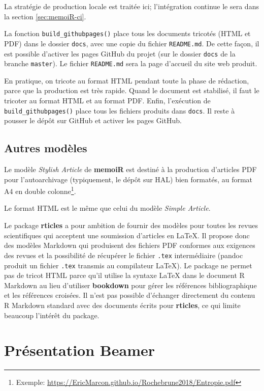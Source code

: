 \documentclass[
  12pt,
  french,
  a4paper,
  extrafontsizes,onecolumn,openright
  ]{memoir}
\begin{document}
La stratégie de production locale est traitée ici; l'intégration continue le sera dans la section \ref{sec:memoiR-ci}.

La fonction \texttt{build\_githubpages()} place tous les documents tricotés (HTML et PDF) dans le dossier \texttt{docs}, avec une copie du fichier \texttt{README.md}.
De cette façon, il est possible d'activer les pages GitHub du projet (sur le dossier \texttt{docs} de la branche \texttt{master}).
Le fichier \texttt{README.md} sera la page d'accueil du site web produit.

En pratique, on tricote au format HTML pendant toute la phase de rédaction, parce que la production est très rapide.
Quand le document est stabilisé, il faut le tricoter au format HTML et au format PDF.
Enfin, l'exécution de \texttt{build\_githubpages()} place tous les fichiers produits dans \texttt{docs}.
Il reste à pousser le dépôt sur GitHub et activer les pages GitHub.

\hypertarget{autres-moduxe8les}{%
\subsection{Autres modèles}\label{autres-moduxe8les}}

Le modèle \emph{Stylish Article} de \textbf{memoiR} est destiné à la production d'articles PDF pour l'autoarchivage (typiquement, le dépôt sur HAL) bien formatés, au format A4 en double colonne\footnote{Exemple: \url{https://EricMarcon.github.io/Rochebrune2018/Entropie.pdf}}.

Le format HTML est le même que celui du modèle \emph{Simple Article}.

Le package \textbf{rticles} a pour ambition de fournir des modèles pour toutes les revues scientifiques qui acceptent une soumission d'articles en LaTeX.
Il propose donc des modèles Markdown qui produisent des fichiers PDF conformes aux exigences des revues et la possibilité de récupérer le fichier \texttt{.tex} intermédiaire (pandoc produit un fichier \texttt{.tex} transmis au compilateur LaTeX).
Le package ne permet pas de tricot HTML parce qu'il utilise la syntaxe LaTeX dans le document R Markdown au lieu d'utiliser \textbf{bookdown} pour gérer les références bibliographique et les références croisées.
Il n'est pas possible d'échanger directement du contenu R Markdown standard avec des documents écrits pour \textbf{rticles}, ce qui limite beaucoup l'intérêt du package.

\hypertarget{pruxe9sentation-beamer}{%
\section{Présentation Beamer}\label{pruxe9sentation-beamer}}
\end{document}
